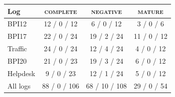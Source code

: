 \begin{tabular}{lccc}
\toprule
Log & \textsc{complete} & \textsc{negative} & \textsc{mature} \\
\midrule
BPI12 & 12 / 0 / 12 & 6 / 0 / 12 & 3 / 0 / 6 \\
BPI17 & 22 / 0 / 24 & 19 / 2 / 24 & 11 / 0 / 12 \\
Traffic & 24 / 0 / 24 & 12 / 4 / 24 & 4 / 0 / 12 \\
BPI20 & 21 / 0 / 23 & 19 / 3 / 24 & 6 / 0 / 12 \\
Helpdesk & 9 / 0 / 23 & 12 / 1 / 24 & 5 / 0 / 12 \\
\midrule
All logs & 88 / 0 / 106 & 68 / 10 / 108 & 29 / 0 / 54 \\
\bottomrule
\end{tabular}
